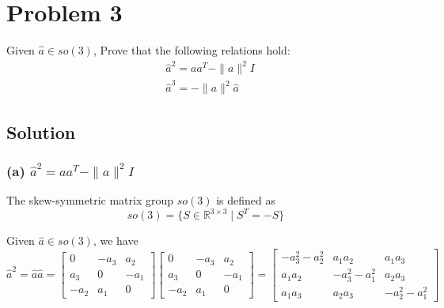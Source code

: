 \section*{Problem 3}

Given \(\hat{a} \in s o(3)\), Prove that the following relations hold:
\begin{align*}
      & \hat{a}^{2}=a a^{T}-\|a\|^{2} I \\
      & \hat{a}^{3}=-\|a\|^{2} \hat{a}
\end{align*}

\subsection*{Solution}

\subsubsection*{(a) \( \hat{a}^{2}=a a^{T}-\|a\|^{2} I \)}

The skew-symmetric matrix group \( s o(3) \) is defined as
\[
     s o(3) = \{ S \in \mathbb{R}^{3 \times 3} \mid S^{T} = -S \}
\]

Given \( \hat{a} \in s o(3) \), we have
\[
     \hat{a}^{2}
     =
     \hat{a} \hat{a}
     =
     \begin{bmatrix}
          0      & -a_{3} & a_{2}  \\
          a_{3}  & 0      & -a_{1} \\
          -a_{2} & a_{1}  & 0
     \end{bmatrix}
     \begin{bmatrix}
          0      & -a_{3} & a_{2}  \\
          a_{3}  & 0      & -a_{1} \\
          -a_{2} & a_{1}  & 0
     \end{bmatrix}
     =
     \begin{bmatrix}
          -a_{3}^{2}-a_{2}^{2} & a_{1} a_{2}          & a_{1} a_{3}          \\
          a_{1} a_{2}          & -a_{3}^{2}-a_{1}^{2} & a_{2} a_{3}          \\
          a_{1} a_{3}          & a_{2} a_{3}          & -a_{2}^{2}-a_{1}^{2}
     \end{bmatrix}
\]

